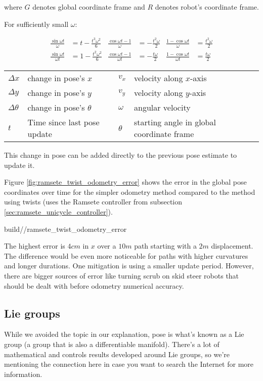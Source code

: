 \begin{theorem}
  where $G$ denotes global coordinate frame and $R$ denotes robot's coordinate
  frame.

  For sufficiently small $\omega$:

  \begin{align}
    \frac{\sin\omega t}{\omega} &= t - \frac{t^3 \omega^2}{6} &
    \frac{\cos\omega t - 1}{\omega} &= -\frac{t^2 \omega}{2} &
    \frac{1 - \cos\omega t}{\omega} &= \frac{t^2 \omega}{2} \\
    \frac{\sin\omega t}{\omega t} &= 1 - \frac{t^2 \omega^2}{6} &
    \frac{\cos\omega t - 1}{\omega t} &= -\frac{t \omega}{2} &
    \frac{1 - \cos\omega t}{\omega t} &= \frac{t \omega}{2}
  \end{align}

  \begin{figurekey}
    \begin{tabular}{llll}
      $\Delta x$ & change in pose's $x$ & $v_x$ & velocity along $x$-axis \\
      $\Delta y$ & change in pose's $y$ & $v_y$ & velocity along $y$-axis \\
      $\Delta \theta$ & change in pose's $\theta$ & $\omega$ & angular velocity
        \\
      $t$ & Time since last pose update & $\theta$ & starting angle in global
        coordinate frame
    \end{tabular}
  \end{figurekey}

  This change in pose can be added directly to the previous pose estimate to
  update it.
\end{theorem}

Figure \ref{fig:ramsete_twist_odometry_error} shows the error in the global pose
coordinates over time for the simpler odometry method compared to the method
using twists (uses the Ramsete controller from subsection
\ref{sec:ramsete_unicycle_controller}).
\begin{svg}{build/\chapterpath/ramsete_twist_odometry_error}
  \caption{Odometry error compared to method using twists ($dt = 0.05s$)}
  \label{fig:ramsete_twist_odometry_error}
\end{svg}

The highest error is $4cm$ in $x$ over a $10m$ path starting with a $2m$
displacement. The difference would be even more noticeable for paths with higher
curvatures and longer durations. One mitigation is using a smaller update
period. However, there are bigger sources of error like turning scrub on skid
steer robots that should be dealt with before odometry numerical accuracy.

\subsection{Lie groups}

While we avoided the topic in our explanation, pose is what's known as a Lie
group (a group that is also a differentiable manifold). There's a lot of
mathematical and controls results  developed around Lie groups, so we're
mentioning the connection here in case you want to search the Internet for more
information.

